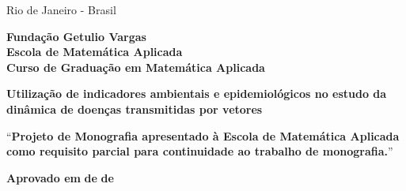 \documentclass[12pt]{article}
\begin{document}
\par
\vfill
\begin{center}
{{\normalsize Rio de Janeiro - Brasil}\\
{\normalsize \the\year}}
\end{center}

\thispagestyle{empty}

\newpage
\begin{center}
\textbf{\LARGE Fundação Getulio Vargas}\\ 
\textbf{\LARGE Escola de Matemática Aplicada}\\
\textbf{\LARGE Curso de Graduação em Matemática Aplicada}

\par
\vspace{55pt}
\textbf{\Large Utilização de indicadores ambientais e epidemiológicos no estudo da dinâmica de doenças transmitidas por vetores}


\par
\vspace{35pt}

``\textbf{Projeto de Monografia apresentado à Escola de Matemática Aplicada como requisito parcial para continuidade ao trabalho de monografia.}''
\end{center}

\par
\vspace{30pt}
\begin{center}

\textbf{Aprovado em } \makebox[30pt]{\hrulefill}\textbf{ de }\makebox[120pt]{\hrulefill}\textbf{ de }\makebox[50pt]{\hrulefill}
\\
\vspace{5pt}
\end{center}
\end{document}
